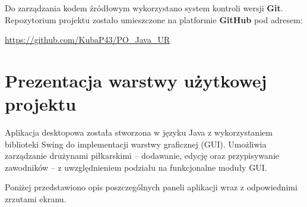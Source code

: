 \documentclass{urdpl}     %
\begin{document}
Do zarządzania kodem źródłowym wykorzystano system kontroli wersji \textbf{Git}. Repozytorium projektu zostało umieszczone na platformie \textbf{GitHub} pod adresem:

\begin{center}
\hypersetup{
    colorlinks=true,
    linkcolor=black,
    urlcolor=black
}
    \url{https://github.com/KubaP43/PO_Java_UR}
\end{center}

\chapter{Prezentacja warstwy użytkowej projektu}\label{4}

Aplikacja desktopowa została stworzona w języku Java z wykorzystaniem biblioteki Swing do implementacji warstwy graficznej (GUI). Umożliwia zarządzanie drużynami piłkarskimi – dodawanie, edycję oraz przypisywanie zawodników – z uwzględnieniem podziału na funkcjonalne moduły GUI.

Poniżej przedstawiono opis poszczególnych paneli aplikacji wraz z odpowiednimi zrzutami ekranu.
\end{document}
